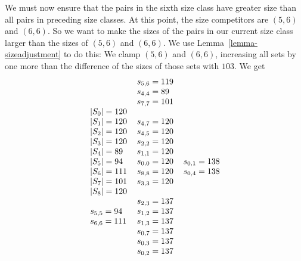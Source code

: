 \documentclass[letterpaper]{article}
\theoremstyle{definition}
\begin{document}
We must now ensure that the pairs in the sixth size class have greater size than all pairs in preceding size classes.  At this point, the size competitors are $(5,6)$ and $(6,6)$.  So we want to make the sizes of the pairs in our current size class larger than the sizes of $(5,6)$ and $(6,6)$.  We use Lemma~\ref{lemma-sizeadjustment} to do this:  We clamp $(5,6)$ and $(6,6)$, increasing all sets by
one more than the difference of the sizes of those sets with $103$.
We get
\[
\arraycolsep=3.0pt
\begin{array}[t]{lllll}
 \begin{array}{l}
|S_0| = 120 \\
|S_1| = 120 \\
|S_2| = 120 \\
|S_3| = 120 \\
|S_4| = 89 \\
|S_5| = 94 \\
|S_6| = 111 \\
|S_7| = 101 \\
|S_8| = 120 \\
\\
s_{5, 5} = 94 \\
s_{6, 6} = 111 \\
\end{array}
 &
\begin{array}{l}
s_{5, 6} = 119 \\
s_{4, 4} = 89 \\
s_{7, 7} = 101 \\
\\
s_{4, 7} = 120 \\
s_{4, 5} = 120 \\
s_{2, 2} = 120 \\
s_{1, 1} = 120 \\
s_{0, 0} = 120 \\
s_{8, 8} = 120 \\
s_{3, 3} = 120 \\
\\
s_{2, 3} = 137 \\
s_{1, 2} = 137 \\
s_{1, 3} = 137 \\
s_{0, 7} = 137 \\
s_{0, 3} = 137 \\
s_{0, 2} = 137 \\
 \end{array}
&
  \begin{array}{l}
s_{0, 1} = 138 \\
s_{0, 4} = 138 \\

\end{array}
\end{array}\]
\end{document}
